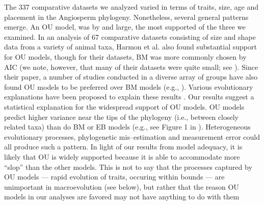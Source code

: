 \documentclass[a4paper,12pt]{article}
\begin{document}
The 337 comparative datasets we analyzed varied in terms of traits, size, age and placement in the Angiosperm phylogeny. Nonetheless, several general patterns emerge. An OU model, was by and large, the most supported of the three we examined. In an analysis of 67 comparative datasets consisting of size and shape data from a variety of animal taxa, Harmon et al. \citep{Harmon2010} also found substantial support for OU models, though for their datasets, BM was more commonly chosen by AIC (we note, however, that many of their datasets were quite small; see \citep{SlaterPennell}). Since their paper, a number of studies conducted in a diverse array of groups have also found OU models to be preferred over BM models (e.g., \citep{Burbrink2012, Wiens2013, Lopez2013}). Various evolutionary explanations have been proposed to explain these results \citep{HansenMartins1996, ButlerKing2004, Hansen2012book, PennellHarmon}. Our results suggest a statistical explanation for the widespread support of OU models. OU models predict higher variance near the tips of the phylogeny (i.e., between closely related taxa) than do BM or EB models (e.g., see Figure 1 in \citep{Harmon2010}). Heterogeneous evolutionary processes, phylogenetic mis--estimation and measurement error \citep{Houle2011, Hansen2012} could all produce such a pattern. In light of our results from model adequacy, it is likely that OU is widely supported because it is able to accommodate more ``slop'' than the other models. This is not to say that the processes captured by OU models --- rapid evolution of traits, occuring within bounds --- are unimportant in macroevolution (see below), but rather that the reason OU models in our analyses are favored may not have anything to do with them
\end{document}
